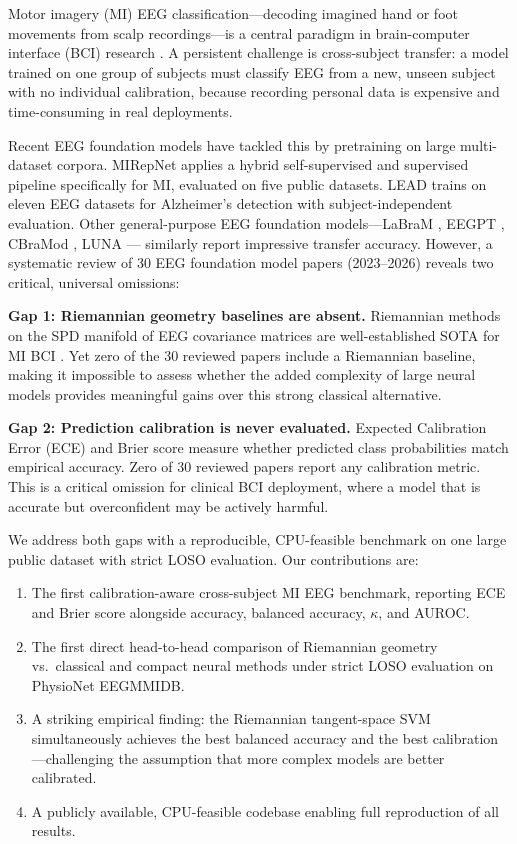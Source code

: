 \documentclass[conference]{IEEEtran}
\begin{document}
Motor imagery (MI) EEG classification—decoding imagined hand or foot
movements from scalp recordings—is a central paradigm in brain-computer
interface (BCI) research \cite{lotte2018review}. A persistent challenge
is cross-subject transfer: a model trained on one group of subjects must
classify EEG from a new, unseen subject with no individual calibration,
because recording personal data is expensive and time-consuming in real
deployments.

Recent EEG foundation models have tackled this by pretraining on large
multi-dataset corpora. MIRepNet \cite{mireNet2025} applies a hybrid
self-supervised and supervised pipeline specifically for MI, evaluated
on five public datasets. LEAD \cite{lead2025} trains on eleven EEG
datasets for Alzheimer's detection with subject-independent evaluation.
Other general-purpose EEG foundation models---LaBraM \cite{labram2024},
EEGPT \cite{eegpt2024}, CBraMod \cite{cbramod2025}, LUNA \cite{luna2025}---
similarly report impressive transfer accuracy. However, a systematic
review of 30 EEG foundation model papers (2023--2026) reveals two
critical, universal omissions:

\textbf{Gap 1: Riemannian geometry baselines are absent.}
Riemannian methods on the SPD manifold of EEG covariance matrices are
well-established SOTA for MI BCI \cite{barachant2012multiclass,
congedo2017riemannian, lotte2018review}. Yet zero of the 30 reviewed
papers include a Riemannian baseline, making it impossible to assess
whether the added complexity of large neural models provides meaningful
gains over this strong classical alternative.

\textbf{Gap 2: Prediction calibration is never evaluated.}
Expected Calibration Error (ECE) \cite{guo2017calibration} and Brier score
measure whether predicted class probabilities match empirical accuracy.
Zero of 30 reviewed papers report any calibration metric. This is a
critical omission for clinical BCI deployment, where a model that is
accurate but overconfident may be actively harmful.

We address both gaps with a reproducible, CPU-feasible benchmark on one
large public dataset with strict LOSO evaluation. Our contributions are:

\begin{enumerate}
\item The first calibration-aware cross-subject MI EEG benchmark, reporting
  ECE and Brier score alongside accuracy, balanced accuracy, $\kappa$,
  and AUROC.
\item The first direct head-to-head comparison of Riemannian geometry vs.\
  classical and compact neural methods under strict LOSO evaluation on
  PhysioNet EEGMMIDB.
\item A striking empirical finding: the Riemannian tangent-space SVM
  simultaneously achieves the best balanced accuracy and the best
  calibration—challenging the assumption that more complex models
  are better calibrated.
\item A publicly available, CPU-feasible codebase enabling full
  reproduction of all results.
\end{enumerate}
\end{document}
